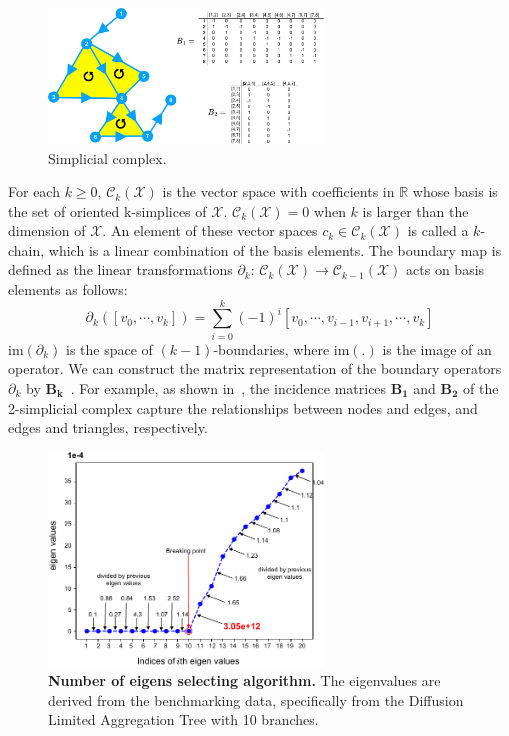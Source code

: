 \begin{figure}[!h]
    \centering
    \includegraphics[width=0.65\textwidth]{Simplicial_Complex/fig}
    \vspace{0.1cm}
    \caption[Simplicial complex.]{Simplicial complex.}
    \label{fig:sc}
\end{figure}


For each $k \geq 0$, $\mathcal{C}_k(\mathcal{X})$ is the vector space with coefficients in $\mathbb{R}$ whose basis is the set of oriented k-simplices of $\mathcal{X}$. $\mathcal{C}_k(\mathcal{X}) = 0$ when $k$ is larger than the dimension of $\mathcal{X}$. An element of these vector spaces $c_k \in \mathcal{C}_k(\mathcal{X})$ is called a $k$-chain, which is a linear combination of the basis elements. The boundary map is defined as the linear transformations $\partial_{k}$: $\mathcal{C}_k(\mathcal{X}) \rightarrow \mathcal{C}_{k-1}(\mathcal{X})$ acts on basis elements as follows:
\begin{equation}
\partial_k ([v_0,\cdots, v_k]) = \sum_{i=0}^{k} (-1)^i [v_0, \cdots, v_{i-1}, v_{i+1}, \cdots, v_k]
\end{equation}
$\mathrm{im}(\partial_k)$ is the space of $(k-1)$-boundaries, where $\mathrm{im}(.)$ is the image of an operator. We can construct the matrix representation of the boundary operators $\partial_k$ by $\mathbf{B_k}$~\citep{lim2020hodge,muhammad2006control}. For example, as shown in~, the incidence matrices $\mathbf{B_1}$ and $\mathbf{B_2}$ of the 2-simplicial complex capture the relationships between nodes and edges, and edges and triangles, respectively.

\begin{figure}[!ht]
	\centering
	\includegraphics[width=0.65\textwidth]{breakingpoint/fig}
	\vspace{0.1cm}
	\caption[Number of eigens selecting algorithm.]{\textbf{Number of eigens selecting algorithm.} The eigenvalues are derived from the benchmarking data, specifically from the Diffusion Limited Aggregation Tree with 10 branches.}
	\label{fig:breakingpoint}
\end{figure}


